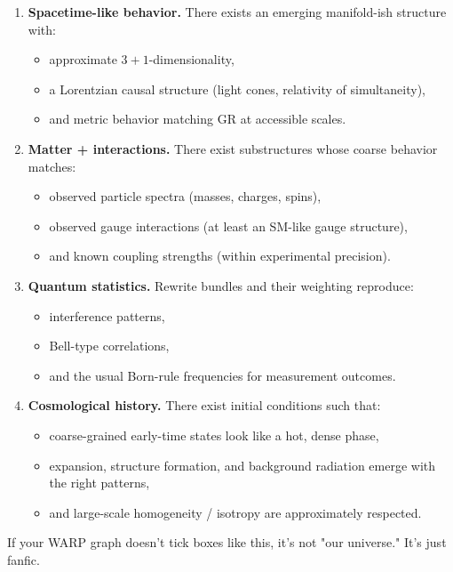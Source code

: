 \begin{enumerate}
  \item \textbf{Spacetime-like behavior.} There exists an emerging manifold-ish structure with:
    \begin{itemize}
      \item approximate $3+1$-dimensionality,
      \item a Lorentzian causal structure (light cones, relativity of simultaneity),
      \item and metric behavior matching GR at accessible scales.
    \end{itemize}

  \item \textbf{Matter + interactions.} There exist substructures whose coarse behavior matches:
    \begin{itemize}
      \item observed particle spectra (masses, charges, spins),
      \item observed gauge interactions (at least an SM-like gauge structure),
      \item and known coupling strengths (within experimental precision).
    \end{itemize}

  \item \textbf{Quantum statistics.} Rewrite bundles and their weighting reproduce:
    \begin{itemize}
      \item interference patterns,
      \item Bell-type correlations,
      \item and the usual Born-rule frequencies for measurement outcomes.
    \end{itemize}

  \item \textbf{Cosmological history.} There exist initial conditions such that:
    \begin{itemize}
      \item coarse-grained early-time states look like a hot, dense phase,
      \item expansion, structure formation, and background radiation emerge with the right patterns,
      \item and large-scale homogeneity / isotropy are approximately respected.
    \end{itemize}
\end{enumerate}

If your WARP graph doesn’t tick boxes like this, it’s not "our universe." It’s just fanfic.

